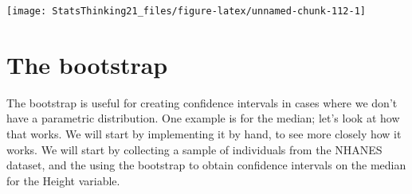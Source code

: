 \documentclass[
  12pt,
]{book}
\newenvironment{Shaded}{\begin{snugshade}}{\end{snugshade}}
\newcommand{\AttributeTok}[1]{\textcolor[rgb]{0.13,0.29,0.53}{#1}}
\newcommand{\CommentTok}[1]{\textcolor[rgb]{0.56,0.35,0.01}{\textit{#1}}}
\newcommand{\ControlFlowTok}[1]{\textcolor[rgb]{0.13,0.29,0.53}{\textbf{#1}}}
\newcommand{\DecValTok}[1]{\textcolor[rgb]{0.00,0.00,0.81}{#1}}
\newcommand{\FloatTok}[1]{\textcolor[rgb]{0.00,0.00,0.81}{#1}}
\newcommand{\FunctionTok}[1]{\textcolor[rgb]{0.13,0.29,0.53}{\textbf{#1}}}
\newcommand{\NormalTok}[1]{#1}
\newcommand{\OtherTok}[1]{\textcolor[rgb]{0.56,0.35,0.01}{#1}}
\newcommand{\SpecialCharTok}[1]{\textcolor[rgb]{0.81,0.36,0.00}{\textbf{#1}}}
\newcommand{\StringTok}[1]{\textcolor[rgb]{0.31,0.60,0.02}{#1}}
\begin{document}
\begin{Shaded}
\end{Shaded}

\texttt{[image: StatsThinking21\_files/figure-latex/unnamed-chunk-112-1]}

\hypertarget{the-bootstrap}{%
\section{The bootstrap}\label{the-bootstrap}}

The bootstrap is useful for creating confidence intervals in cases where we don't have a parametric distribution. One example is for the median; let's look at how that works. We will start by implementing it by hand, to see more closely how it works. We will start by collecting a sample of individuals from the NHANES dataset, and the using the bootstrap to obtain confidence intervals on the median for the Height variable.
\end{document}
